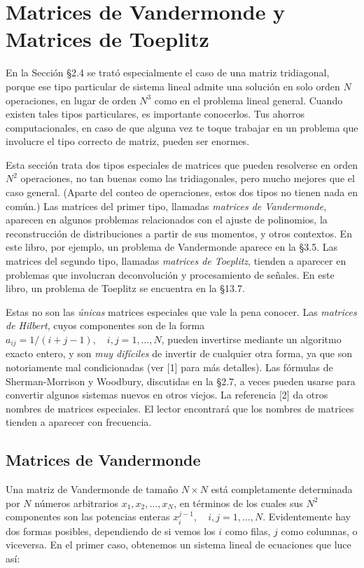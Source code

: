 \documentclass[10pt,a4paper]{book}
\begin{document}
\newpage

\section{Matrices de Vandermonde y Matrices de Toeplitz}

En la Sección §2.4 se trató especialmente el caso de una matriz tridiagonal, porque ese tipo particular de sistema lineal admite una solución en solo orden \(N\) operaciones, en lugar de orden \(N^3\) como en el problema lineal general. Cuando existen tales tipos particulares, es importante conocerlos. Tus ahorros computacionales, en caso de que alguna vez te toque trabajar en un problema que involucre el tipo correcto de matriz, pueden ser enormes.

Esta sección trata dos tipos especiales de matrices que pueden resolverse en orden \(N^2\) operaciones, no tan buenas como las tridiagonales, pero mucho mejores que el caso general. (Aparte del conteo de operaciones, estos dos tipos no tienen nada en común.) Las matrices del primer tipo, llamadas \textit{matrices de Vandermonde}, aparecen en algunos problemas relacionados con el ajuste de polinomios, la reconstrucción de distribuciones a partir de sus momentos, y otros contextos. En este libro, por ejemplo, un problema de Vandermonde aparece en la §3.5. Las matrices del segundo tipo, llamadas \textit{matrices de Toeplitz}, tienden a aparecer en problemas que involucran deconvolución y procesamiento de señales. En este libro, un problema de Toeplitz se encuentra en la §13.7.

Estas no son las \textit{únicas} matrices especiales que vale la pena conocer. Las \textit{matrices de Hilbert}, cuyos componentes son de la forma \(a_{ij} = 1/(i + j - 1), \quad i,j = 1, \ldots, N\), pueden invertirse mediante un algoritmo exacto entero, y son \textit{muy difíciles} de invertir de cualquier otra forma, ya que son notoriamente mal condicionadas (ver [1] para más detalles). Las fórmulas de Sherman-Morrison y Woodbury, discutidas en la §2.7, a veces pueden usarse para convertir algunos sistemas nuevos en otros viejos. La referencia [2] da otros nombres de matrices especiales. El lector encontrará que los nombres de matrices tienden a aparecer con frecuencia.

\subsection{Matrices de Vandermonde}

Una matriz de Vandermonde de tamaño \(N \times N\) está completamente determinada por \(N\) números arbitrarios \(x_1, x_2, \ldots, x_N\), en términos de los cuales sus \(N^2\) componentes son las potencias enteras \(x_i^{j-1},\quad i,j = 1, \ldots, N\). Evidentemente hay dos formas posibles, dependiendo de si vemos los \(i\) como filas, \(j\) como columnas, o viceversa. En el primer caso, obtenemos un sistema lineal de ecuaciones que luce así:
\end{document}
